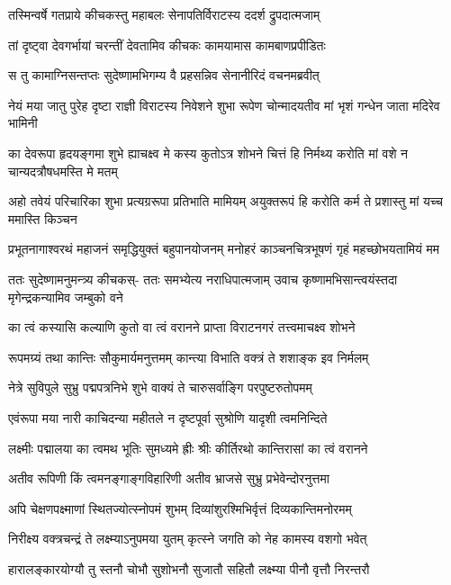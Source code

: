 \twolineshloka
{तस्मिन्वर्षे गतप्राये कीचकस्तु महाबलः}
{सेनापतिर्विराटस्य ददर्श द्रुपदात्मजाम्}


\twolineshloka
{तां दृष्ट्वा देवगर्भायां चरन्तीं देवतामिव}
{कीचकः कामयामास कामबाणप्रपीडितः}


\twolineshloka
{स तु कामाग्निसन्तप्तः सुदेष्णामभिगम्य वै}
{प्रहसन्निव सेनानीरिदं वचनमब्रवीत्}


\fourlineindentedshloka
{नेयं मया जातु पुरेह दृष्टा}
{राज्ञी विराटस्य निवेशने शुभा}
{रूपेण चोन्मादयतीव मां भृशं}
{गन्धेन जाता मदिरेव भामिनी}


\fourlineindentedshloka
{का देवरूपा हृदयङ्गमा शुभे}
{ह्याचक्ष्व मे कस्य कुतोऽत्र शोभने}
{चित्तं हि निर्मथ्य करोति मां वशे}
{न चान्यदत्रौषधमस्ति मे मतम्}


\fourlineindentedshloka
{अहो तवेयं परिचारिका शुभा}
{प्रत्यग्ररूपा प्रतिभाति मामियम्}
{अयुक्तरूपं हि करोति कर्म ते}
{प्रशास्तु मां यच्च ममास्ति किञ्चन}


\fourlineindentedshloka
{प्रभूतनागाश्वरथं महाजनं}
{समृद्धियुक्तं बहुपानयोजनम्}
{मनोहरं काञ्चनचित्रभूषणं}
{गृहं महच्छोभयतामियं मम}


\fourlineindentedshloka
{ततः सुदेष्णामनुमन्त्र्य कीचकस्-}
{ततः समभ्येत्य नराधिपात्मजाम्}
{उवाच कृष्णामभिसान्त्वयंस्तदा}
{मृगेन्द्रकन्यामिव जम्बुको वने}


\twolineshloka
{का त्वं कस्यासि कल्याणि कुतो वा त्वं वरानने}
{प्राप्ता विराटनगरं तत्त्वमाचक्ष्व शोभने}


\twolineshloka
{रूपमग्र्यं तथा कान्तिः सौकुमार्यमनुत्तमम्}
{कान्त्या विभाति वक्त्रं ते शशाङ्क इव निर्मलम्}


\twolineshloka
{नेत्रे सुविपुले सुभ्रु पद्मपत्रनिभे शुभे}
{वाक्यं ते चारुसर्वाङ्गि परपुष्टरुतोपमम्}


\twolineshloka
{एवंरूपा मया नारी काचिदन्या महीतले}
{न दृष्टपूर्वा सुश्रोणि यादृशी त्वमनिन्दिते}


\twolineshloka
{लक्ष्मीः पद्मालया का त्वमथ भूतिः सुमध्यमे}
{ह्रीः श्रीः कीर्तिरथो कान्तिरासां का त्वं वरानने}


\twolineshloka
{अतीव रूपिणी किं त्वमनङ्गाङ्गविहारिणी}
{अतीव भ्राजसे सुभ्रु प्रभेवेन्दोरनुत्तमा}


\twolineshloka
{अपि चेक्षणपक्ष्माणां स्थितज्योत्स्नोपमं शुभम्}
{दिव्यांशुरश्मिभिर्वृत्तं दिव्यकान्तिमनोरमम्}


\twolineshloka
{निरीक्ष्य वक्त्रचन्द्रं ते लक्ष्म्याऽनुपमया युतम्}
{कृत्स्ने जगति को नेह कामस्य वशगो भवेत्}


\twolineshloka
{हारालङ्कारयोग्यौ तु स्तनौ चोभौ सुशोभनौ}
{सुजातौ सहितौ लक्ष्म्या पीनौ वृत्तौ निरन्तरौ}


